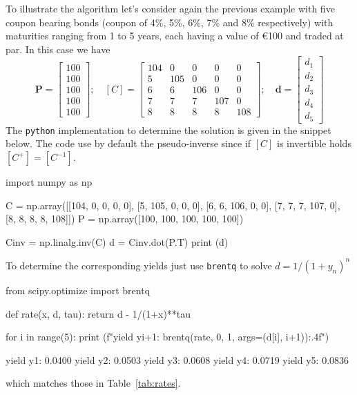 To illustrate the algorithm let's consider again the previous example with five coupon bearing bonds (coupon of 4\%, 5\%, 6\%, 7\% and 8\% respectively) with maturities ranging from 1 to 5 years, each having a value of \euro{100} and traded at par. In this case we have
\begin{equation*}
\boldsymbol{P} = 
\begin{bmatrix}
100 \\
100 \\
100 \\
100 \\
100 
\end{bmatrix}; \quad
[C] = 
\begin{bmatrix}
104 & 0 & 0 & 0 & 0 \\
5 & 105 & 0 & 0 & 0 \\
6 & 6 & 106 & 0 & 0 \\
7 & 7 & 7 & 107 & 0 \\
8 & 8 & 8 & 8 & 108
\end{bmatrix}; \quad \boldsymbol{d} =
\begin{bmatrix}
d_1 \\
d_2 \\
d_3 \\
d_4 \\
d_5 
\end{bmatrix}
\end{equation*}
The \texttt{python} implementation to determine the solution is given in the snippet below. The code use by default the pseudo-inverse since if $[C]$ is invertible holds $[C^+] = [C^{-1}]$. 
\begin{ipython}
import numpy as np

C = np.array([[104, 0, 0, 0, 0],
              [5, 105, 0, 0, 0],
              [6, 6, 106, 0, 0],
              [7, 7, 7, 107, 0],
              [8, 8, 8, 8, 108]])
P = np.array([100, 100, 100, 100, 100])

Cinv = np.linalg.inv(C)
d = Cinv.dot(P.T)
print (d)
\end{ipython}
\begin{ioutput}
[0.96153846 0.90659341 0.83765291 0.75756548 0.66938146]	
\end{ioutput}
To determine the corresponding yields just use \texttt{brentq} to solve $d=1/(1+y_n)^{n}$
\begin{ipython}
from scipy.optimize import brentq

def rate(x, d, tau):
    return d - 1/(1+x)**tau

for i in range(5):
    print (f"yield y{i+1}: {brentq(rate, 0, 1, args=(d[i], i+1)):.4f}")
\end{ipython}
\begin{ioutput}
yield y1: 0.0400
yield y2: 0.0503
yield y3: 0.0608
yield y4: 0.0719
yield y5: 0.0836
\end{ioutput}
which matches those in Table~\ref{tab:rates}.

